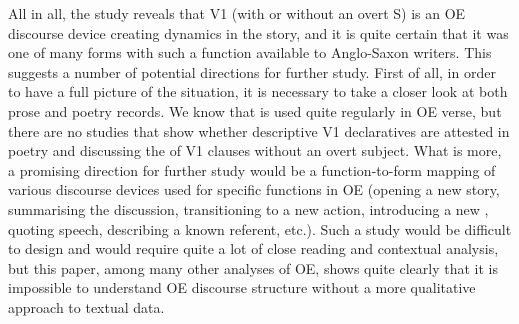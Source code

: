 \documentclass[output=paper,colorlinks,citecolor=brown]{langscibook}
\begin{document}
All in all, the study reveals that V1 (with or without an overt S) is an OE discourse device creating dynamics in the story, and it is quite certain that it was one of many forms with such a function available to Anglo-Saxon writers. This suggests a number of potential directions for further study. First of all, in order to have a full picture of the situation, it is necessary to take a closer look at both prose and poetry records. We know that  is used quite regularly in OE verse, but there are no studies that show whether descriptive V1 declaratives are attested in poetry and discussing the  of V1 clauses without an overt subject. What is more, a promising direction for further study would be a function-to-form mapping of various discourse devices used for specific functions in OE (opening a new story, summarising the discussion, transitioning to a new action, introducing a new , quoting speech, describing a known referent, etc.). Such a study would be difficult to design and would require quite a lot of close reading and contextual analysis, but this paper, among many other analyses of OE, shows quite clearly that it is impossible to understand OE discourse structure without a more qualitative approach to textual data.

\sloppy\printbibliography[heading=subbibliography,notkeyword=this]
\end{document}
